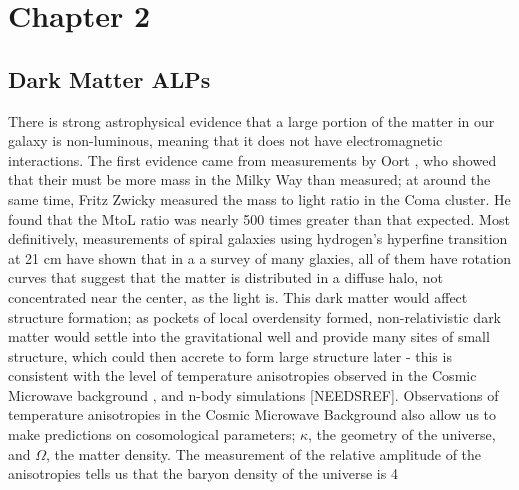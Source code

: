 \documentclass[12pt, twosides]{book}
\begin{document}
\chapter{Chapter 2}
\section{Dark Matter ALPs}

There is strong astrophysical evidence that a large portion of the matter in our galaxy is non-luminous, meaning that it does not have electromagnetic interactions. The first evidence came from measurements by Oort \cite{oort32}, who showed that their must be more mass in the Milky Way than measured; at around the same time, Fritz Zwicky \cite{zwicky37} measured the mass to light ratio in the Coma cluster. He found that the MtoL ratio was nearly 500 times greater than that expected. Most definitively, measurements of spiral galaxies using hydrogen's hyperfine transition at 21 cm have shown that in a a survey of many glaxies, all of them have rotation curves that suggest that the matter is distributed in a diffuse halo, not concentrated near the center, as the light is\cite{rubin80}. This dark matter would affect structure formation; as pockets of local overdensity formed, non-relativistic dark matter would settle into the gravitational well and provide many sites of small structure, which could then accrete to form large structure later - this is consistent with the level of temperature anisotropies observed in the Cosmic Microwave background \cite{planck13}, and n-body simulations [NEEDSREF]. Observations of temperature anisotropies in the Cosmic Microwave Background also allow us to make predictions on cosomological parameters; $\kappa$, the geometry of the universe, and $\Omega$, the matter density. The measurement of the relative amplitude of the anisotropies tells us that the baryon density of the universe is 4%
\end{document}
